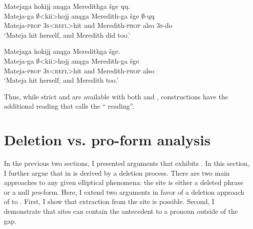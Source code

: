\documentclass[output=paper]{LSP/langsci}
\begin{document}
{{\ea\label{ex:johnson:45}
\ea\label{ex:johnson:45a} 
\glll Matejaga hokijį anąga Meredithga šge ųų.\\
Mateja-ga $\emptyset$<kii>hojį anąga Meredith-ga šge $\emptyset$-ųų\\
Mateja-\textsc{prop} \textsc{3s}<\textsc{refl}>hit and Meredith-\textsc{prop} also \textsc{3s}-do\\
\trans `Mateja hit herself, and Meredith did too.'

\ex\label{ex:johnson:45b}
\glll Matejaga hokijį anąga Meredithga šge.\\
Mateja-ga $\emptyset$<kii>hojį anąga Meredith-ga šge\\ 
Mateja-\textsc{prop} \textsc{3s}<\textsc{refl}>hit and Meredith-\textsc{prop} also\\ 
\trans `Mateja hit herself, and Meredith too.'
\z
\z

Thus, while strict and  are available with both  and ,  constructions have the additional reading that \citet{Fortin2007} calls the `` reading''.


\section{Deletion vs. pro-form analysis}\label{sec:johnson:4}

In the previous two sections, I presented arguments that  exhibits . In this section, I further argue that  in  is derived by a deletion process. There are two main approaches to any given elliptical phenomena: the  site is either a deleted phrase or a null \emph{pro}-form. Here, I extend two arguments in favor of a deletion approach of   to . First, I show that extraction from the  site is possible. Second, I demonstrate that  sites can contain the antecedent to a pronoun outside of the gap.

}}
\end{document}
